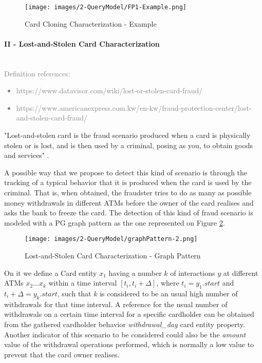\begin{figure}[H]
  \centering
  \texttt{[image: images/2-QueryModel/FP1-Example.png]}
  \caption{Card Cloning Characterization - Example}
  \label{img:graphPattern-1-Example}
\end{figure}

\paragraph{II - Lost-and-Stolen Card Characterization\\\\}

\textcolor{gray}{Definition references:
\begin{itemize}
    \item https://www.datavisor.com/wiki/lost-or-stolen-card-fraud/
    \item https://www.americanexpress.com.kw/en-kw/fraud-protection-center/lost-and-stolen-card-fraud/
\end{itemize}
}

"Lost-and-stolen card is the fraud scenario produced when a card is physically stolen or is lost, and is then used by a criminal, posing as you, to obtain goods and services" \cite{FP-lost-and-stolen-americanexpress2025}.

A possible way that we propose to detect this kind of scenario is through the tracking of a typical behavior that it is produced when the card is used by the criminal. That is, when obtained, the fraudster tries to do as many as possible money withdrawals in different ATMs before the owner of the card realises and asks the bank to freeze the card. The detection of this kind of fraud scenario is modeled with a PG graph pattern as the one represented on Figure \ref{img:graphPattern-2}.

\begin{figure}[H]
  \centering
  \texttt{[image: images/2-QueryModel/graphPattern-2.png]}
  \caption{Lost-and-Stolen Card Characterization - Graph Pattern}
  \label{img:graphPattern-2}
\end{figure}

On it we define a Card entity $x_1$ having a number $k$ of interactions $y$ at different ATMs $x_2 ... x_k$ within a time interval $[t_i, t_i + \Delta]$, where $t_i = y_1.\textit{start}$ and $t_i + \Delta = y_k.\textit{start}$, such that $k$ is considered to be an usual high number of withdrawals for that time interval. A reference for the usual number of withdrawals on a certain time interval for a specific cardholder can be obtained from the gathered cardholder behavior \emph{withdrawal\_day} card entity property.
Another indicator of this scenario to be considered could also be the \emph{amount} value of the withdrawal operations performed, which is normally a low value to prevent that the card owner realises.

